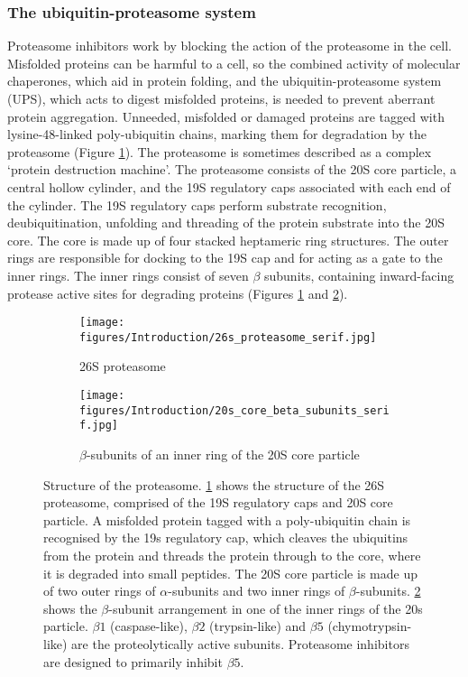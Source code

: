 \subsubsection{The ubiquitin-proteasome system}
Proteasome inhibitors work by blocking the action of the proteasome in the cell.
Misfolded proteins can be harmful to a cell, so the combined activity of molecular chaperones, which aid in protein folding, and the ubiquitin-proteasome system (UPS), which acts to digest misfolded proteins, is needed to prevent aberrant protein aggregation.
Unneeded, misfolded or damaged proteins are tagged with lysine-48-linked poly-ubiquitin chains, marking them for degradation by the proteasome (Figure \ref{fig:26s_proteasome_structure}).
The proteasome is sometimes described as a complex `protein destruction machine'.
The proteasome consists of the 20S core particle, a central hollow cylinder, and the 19S regulatory caps associated with each end of the cylinder.
The 19S regulatory caps perform substrate recognition, deubiquitination, unfolding and threading of the protein substrate into the 20S core.
The core is made up of four stacked heptameric ring structures.
The outer rings are responsible for docking to the 19S cap and for acting as a gate to the inner rings. The inner rings consist of seven $\beta$ subunits, containing inward-facing protease active sites for degrading proteins\cite{kleiger2014perilous, alberts2007molecular} (Figures \ref{fig:26s_proteasome_structure} and  \ref{fig:proteasome_beta_subunits}).

\begin{figure}[ht]
\begin{subfigure}[t]{0.5\textwidth}
    \texttt{[image: figures/Introduction/26s\_proteasome\_serif.jpg]}
    \caption{26S proteasome}
    \label{fig:26s_proteasome_structure}
\end{subfigure}
\begin{subfigure}[t]{0.5\textwidth}
    \texttt{[image: figures/Introduction/20s\_core\_beta\_subunits\_serif.jpg]}
    \caption{$\beta$-subunits of an inner ring of the 20S core particle }
    \label{fig:proteasome_beta_subunits}
\end{subfigure}
    \caption[Structure of the proteasome]{Structure of the proteasome. \ref{fig:26s_proteasome_structure} shows the structure of the 26S proteasome, comprised of the 19S regulatory caps and 20S core particle.
    A misfolded protein tagged with a poly-ubiquitin chain is recognised by the 19s regulatory cap, which cleaves the ubiquitins from the protein and threads the protein through to the core, where it is degraded into small peptides.
    The 20S core particle is made up of two outer rings of $\alpha$-subunits and two inner rings of $\beta$-subunits.
    \ref{fig:proteasome_beta_subunits} shows the $\beta$-subunit arrangement in one of the inner rings of the 20s particle.
    $\beta1$ (caspase-like), $\beta2$ (trypsin-like) and $\beta5$ (chymotrypsin-like) are the proteolytically active subunits.
    Proteasome inhibitors are designed to primarily inhibit $\beta5$.}
\label{fig:proteasome_and_beta}
\end{figure}

